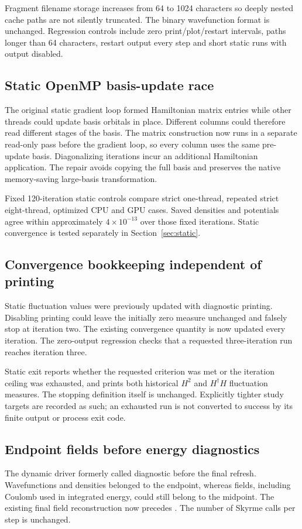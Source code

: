 \documentclass[11pt,a4paper]{article}
\newcommand{\code}[1]{\texttt{\detokenize{#1}}}
\begin{document}
Fragment filename storage increases from 64 to 1024 characters so deeply
nested cache paths are not silently truncated. The binary wavefunction format is unchanged. Regression controls include
zero print/plot/restart intervals, paths longer than 64 characters,
restart output every step and short static runs with output disabled.

\subsection{Static OpenMP basis-update race}
The original static gradient loop formed Hamiltonian matrix entries while
other threads could update basis orbitals in place. Different columns could
therefore read different stages of the basis. The matrix construction now
runs in a separate read-only pass before the gradient loop, so every column
uses the same pre-update basis. Diagonalizing iterations incur an additional
Hamiltonian application. The repair avoids copying the full basis and
preserves the native memory-saving large-basis transformation.

Fixed 120-iteration static controls compare strict one-thread, repeated
strict eight-thread, optimized CPU and GPU cases. Saved densities and potentials agree within approximately
$4\times10^{-13}$ over those fixed iterations. Static convergence is
tested separately in Section~\ref{sec:static}.

\subsection{Convergence bookkeeping independent of printing}
Static fluctuation values were previously updated with diagnostic printing.
Disabling printing could leave the initially zero measure unchanged and
falsely stop at iteration two. The existing convergence quantity is now
updated every iteration. The zero-output regression checks that a requested
three-iteration run reaches iteration three.

Static exit reports whether the requested criterion was met or the iteration
ceiling was exhausted, and prints both historical $H^2$ and $H^\dagger H$
fluctuation measures. The stopping definition itself is unchanged. Explicitly
tighter study targets are recorded as such; an exhausted run is not converted
to success by its finite output or process exit code.

\subsection{Endpoint fields before energy diagnostics}
The dynamic driver formerly called diagnostic \code{tinfo} before the final
\code{skyrme} refresh. Wavefunctions and densities belonged to the endpoint,
whereas fields, including Coulomb used in integrated energy, could still
belong to the midpoint. The existing final field reconstruction now precedes
\code{tinfo}. The number of Skyrme calls per step is unchanged.
\end{document}
